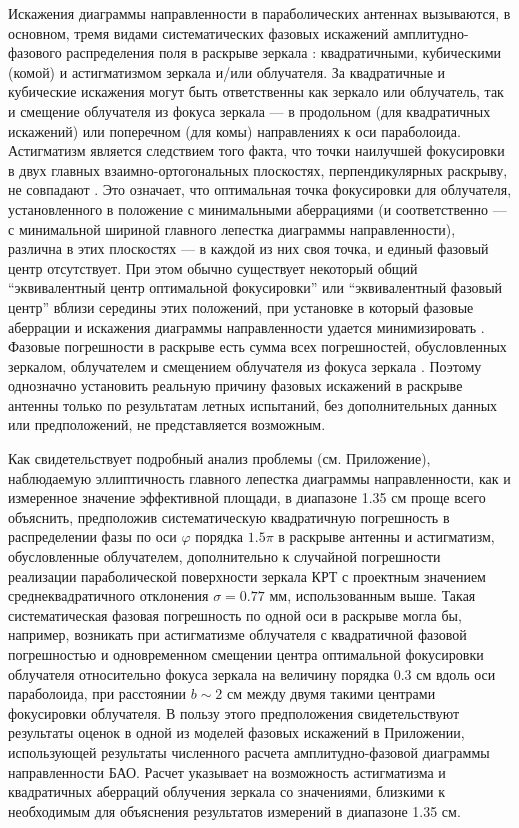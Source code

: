 Искажения диаграммы направленности в параболических антеннах вызываются,
в основном, тремя видами систематических фазовых искажений амплитудно-фазового
распределения поля в раскрыве зеркала  \cite{}:
квадратичными, кубическими (комой) и астигматизмом зеркала и/или облучателя.
За квадратичные и кубические искажения могут быть ответственны как зеркало или
облучатель, так и смещение облучателя из фокуса зеркала --- в продольном
(для квадратичных искажений) или поперечном (для комы) направлениях к оси
параболоида.
Астигматизм является следствием того факта, что точки наилучшей фокусировки
в двух главных взаимно-ортогональных плоскостях, перпендикулярных раскрыву,
не совпадают  \cite{}.
Это означает, что оптимальная точка фокусировки для облучателя, установленного
в положение с минимальными аберрациями (и соответственно --- с минимальной
шириной главного лепестка диаграммы направленности), различна в этих плоскостях ---
в каждой из них своя точка, и единый фазовый центр отсутствует.
При этом обычно существует некоторый общий ``эквивалентный центр оптимальной
фокусировки'' или ``эквивалентный фазовый центр'' вблизи середины этих положений,
при установке в который фазовые аберрации и искажения диаграммы
направленности удается минимизировать  \cite{}.
Фазовые погрешности в раскрыве есть сумма всех погрешностей,
обусловленных зеркалом, облучателем и смещением облучателя из фокуса зеркала
\cite{}.
Поэтому однозначно установить реальную причину фазовых искажений в раскрыве
антенны только по результатам летных испытаний, без дополнительных данных или
предположений, не представляется возможным.

Как свидетельствует подробный анализ проблемы (см. Приложение),
наблюдаемую эллиптичность главного лепестка диаграммы направленности,
как и измеренное значение эффективной площади, в диапазоне 1.35 см
проще всего объяснить, предположив систематическую квадратичную погрешность
в распределении фазы по оси $\varphi$ порядка $1.5 \pi$ в раскрыве
антенны и астигматизм, обусловленные облучателем, дополнительно к случайной
погрешности реализации параболической поверхности зеркала КРТ с проектным
значением среднеквадратичного отклонения $\sigma = 0.77$ мм, использованным выше.
Такая систематическая фазовая погрешность по одной оси в раскрыве могла бы,
например, возникать при астигматизме облучателя с квадратичной фазовой
погрешностью и одновременном смещении центра оптимальной фокусировки облучателя
относительно фокуса зеркала на величину порядка 0.3 см вдоль оси параболоида,
при расстоянии $b \sim 2$ см между двумя такими центрами фокусировки облучателя.
В пользу этого предположения свидетельствуют результаты оценок в одной из
моделей фазовых искажений в Приложении, использующей результаты численного
расчета \cite{}  амплитудно-фазовой диаграммы направленности БАО.
Расчет \cite{} указывает на возможность астигматизма и квадратичных
аберраций облучения зеркала со значениями, близкими к необходимым для объяснения
результатов измерений в диапазоне 1.35 см.

